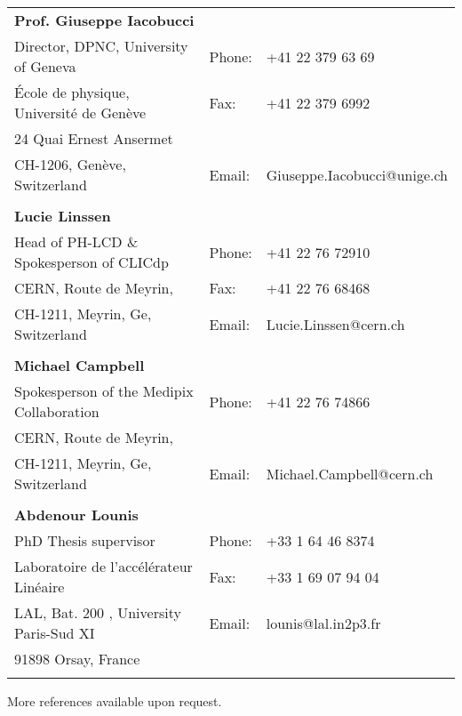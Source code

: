 
\begin{tabular}{@{}lll@{}}
\textbf{Prof. Giuseppe Iacobucci} & \\
Director, DPNC, University of Geneva \ & Phone: & +41 22 379 63 69 \\ 
École de physique, Université de Genève \ & Fax: & +41 22 379 6992\\
24 Quai Ernest Ansermet \\  CH-1206, Genève, Switzerland & Email: & Giuseppe.Iacobucci@unige.ch \\
 & \\
\textbf{Lucie Linssen} & \\
Head of PH-LCD \& Spokesperson of CLICdp     \  & Phone: &  +41 22 76 72910\\
CERN, Route de Meyrin,  & Fax: & +41 22 76 68468\\
CH-1211, Meyrin, Ge, Switzerland & Email: & Lucie.Linssen@cern.ch\\
 & \\
\textbf{Michael Campbell \ } & \\
Spokesperson of  the Medipix Collaboration & Phone: &  +41 22 76 74866\\
CERN, Route de Meyrin, \\
CH-1211, Meyrin, Ge, Switzerland & Email: & Michael.Campbell@cern.ch \\
& \\
\textbf{Abdenour Lounis} & \\
PhD Thesis supervisor & Phone: & +33 1 64 46 8374\\
Laboratoire de l'acc\'el\'erateur Lin\'eaire \ & Fax: & +33 1 69 07 94 04\\
LAL, Bat. 200 , University Paris-Sud XI & Email: & lounis@lal.in2p3.fr \\
91898 Orsay, France \\
 & \\
\end{tabular}

More references available upon request.

